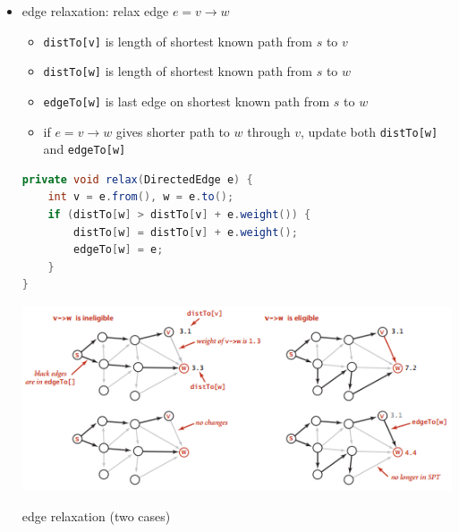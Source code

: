\documentclass[8pt,a4paper,compress]{beamer}
\begin{document}
\begin{frame}[fragile]
\begin{itemize}
\item edge relaxation: relax edge $e = v\to w$
\begin{itemize}
\item \lstinline{distTo[v]} is length of shortest known path from $s$ to $v$

\item \lstinline{distTo[w]} is length of shortest known path from $s$ to $w$

\item \lstinline{edgeTo[w]} is last edge on shortest known path from $s$ to $w$

\item if $e = v\to w$ gives shorter path to $w$ through $v$, update both \lstinline{distTo[w]} and \lstinline{edgeTo[w]}
\end{itemize}

\begin{lstlisting}[language=Java]
private void relax(DirectedEdge e) {
    int v = e.from(), w = e.to();
    if (distTo[w] > distTo[v] + e.weight()) {
        distTo[w] = distTo[v] + e.weight();
        edgeTo[w] = e;
    }
}
\end{lstlisting}

\begin{center}
\includegraphics[scale=0.4]{./figures/sp3.png}

\smallskip

\small edge relaxation (two cases)
\end{center}
\end{itemize}
\end{frame}
\end{document}

